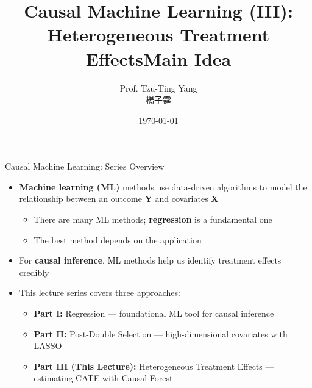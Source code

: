 \documentclass[hyperref={pdfpagelabels=false}]{beamer}
\title[]
{Causal Machine Learning (III): Heterogeneous Treatment Effects}
\author
{Prof. Tzu-Ting Yang  \\ 楊子霆}
\institute{Institute of Economics, Academia Sinica  \\ 中央研究院經濟研究所}
\date
{\today}
\begin{document}
\begin{frame}{}
	\titlepage
\end{frame}




\title[]
{Main Idea}

\author{}
\institute{}
\date{}

\begin{frame}{}
	\titlepage
\end{frame}




\begin{frame}{Causal Machine Learning: Series Overview}
	\begin{itemize}
		\item \textbf{Machine learning (ML)} methods use data-driven algorithms to model the relationship between an outcome \textbf{Y} and covariates \textbf{X}
		\vspace{0.2cm}
		\begin{itemize}
			\item There are many ML methods; \textbf{regression} is a fundamental one
			\vspace{0.2cm}
			\item The best method depends on the application
		\end{itemize}
		\vspace{0.3cm}
		\item For \textbf{causal inference}, ML methods help us identify treatment effects credibly
		\vspace{0.3cm}
		\item This lecture series covers three approaches:
		\vspace{0.2cm}
		\begin{itemize}
			\item \textbf{Part I:} Regression --- foundational ML tool for causal inference
			\vspace{0.2cm}
			\item \textbf{Part II:} Post-Double Selection --- high-dimensional covariates with LASSO
			\vspace{0.2cm}
			\item \textbf{Part III (This Lecture):} Heterogeneous Treatment Effects --- estimating CATE with Causal Forest
		\end{itemize}
	\end{itemize}
\end{frame}
\end{document}
